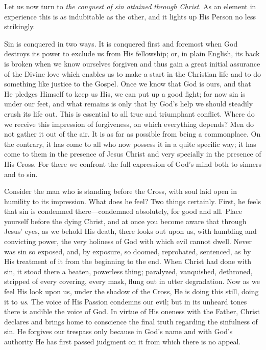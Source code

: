 \documentclass[12pt,a5paper,oneside]{book}
\begin{document}
Let us now turn to \textit{the conquest of sin attained
through Christ}. As an element in experience
this is as indubitable as the other, and it lights
up His Person no less strikingly.

Sin is conquered in two ways. It is conquered 
first and foremost when God destroys
its power to exclude us from His fellowship;
or, in plain English, its back is broken when
we know ourselves forgiven and thus gain a
great initial assurance of the Divine love which
enables us to make a start in the Christian life
and to do something like justice to the Gospel.
Once we know that God is ours, and that He
pledges Himself to keep us His, we can put
up a good fight; for now sin is under our feet,
and what remains is only that by God's help
we should steadily crush its life out. This is
essential to all true and triumphant conflict.
Where do we receive this impression of forgiveness, 
on which everything depends? Men do not
gather it out of the air. It is as far as possible
from being a commonplace. On the contrary,
it has come to all who now possess it in a quite
specific way; it has come to them in the presence
of Jesus Christ and very specially in the presence
of His Cross. For there we confront the full
expression of God's mind both to sinners and
to sin.

Consider the man who is standing before the
Cross, with soul laid open in humility to its impression. 
What does he feel? Two things
certainly. First, he feels that sin is condemned
there---condemned absolutely, for good and all.
Place yourself before the dying Christ, and at
once you become aware that through Jesus'
eyes, as we behold His death, there looks out
upon us, with humbling and convicting power,
the very holiness of God with which evil
cannot dwell. Never was sin so exposed, and,
by exposure, so doomed, reprobated, sentenced,
as by His treatment of it from the beginning to
the end. When Christ had done with sin, it stood
there a beaten, powerless thing; paralyzed, vanquished, 
dethroned, stripped of every covering,
every mask, flung out in utter degradation. Now
as we feel His look upon us, under the shadow of
the Cross, He is doing this still, doing it to \textit{us}.
The voice of His Passion condemns our evil;
but in its unheard tones there is audible the
voice of God. In virtue of His oneness with
the Father, Christ declares and brings home to
conscience the final truth regarding the sinfulness 
of sin. He forgives our trespass only
because in God's name and with God's authority
He has first passed judgment on it from which
there is no appeal.
\end{document}

